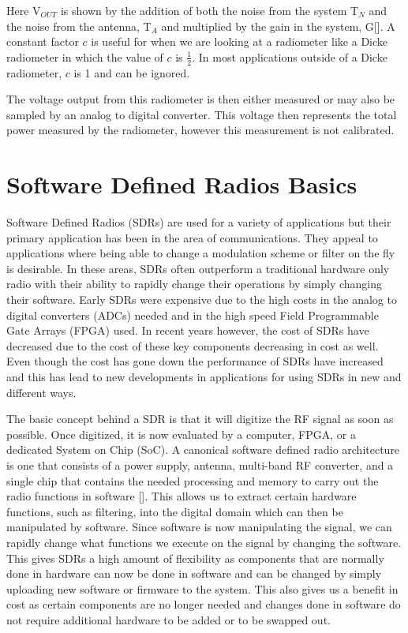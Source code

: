Here V$_{OUT}$ is shown by the addition of both the noise from the system T$_N$ and the noise from the antenna, T$_A$ and multiplied by the gain in the system, G[\cite{skou}].  A constant factor $c$ is useful for when we are looking at a radiometer like a Dicke radiometer in which the value of $c$ is $\frac{1}{2}$.  In most applications outside of a Dicke radiometer, $c$ is 1 and can be ignored.  

The voltage output from this radiometer is then either measured or may also be sampled by an analog to digital converter.  This voltage then represents the total power measured by the radiometer, however this measurement is not calibrated.
 
\section{Software Defined Radios Basics} 
Software Defined Radios (SDRs) are used for a variety of applications but their primary application has been in the area of communications.  They appeal to applications where being able to change a modulation scheme or filter on the fly is desirable.  In these areas, SDRs often outperform a traditional hardware only radio with their ability to rapidly change their operations by simply changing their software.  Early SDRs were expensive due to the high costs in the analog to digital converters (ADCs) needed and in the high speed Field Programmable Gate Arrays (FPGA) used.  In recent years however, the cost of SDRs have decreased due to the cost of these key components decreasing in cost as well.  Even though the cost has gone down the performance of SDRs have increased and this has lead to new developments in applications for using SDRs in new and different ways.

The basic concept behind a SDR is that it will digitize the RF signal as soon as possible.  Once digitized, it is now evaluated by a computer, FPGA, or a dedicated System on Chip (SoC).  A canonical software defined radio architecture is one that consists of a power supply, antenna, multi-band RF converter, and a single chip that contains the needed processing and memory to carry out the radio functions in software [\cite{Mitola1995}]. This allows us to extract certain hardware functions, such as filtering, into the digital domain which can then be manipulated by software.  Since software is now manipulating the signal, we can rapidly change what functions we execute on the signal by changing the software.  This gives SDRs a high amount of flexibility as components that are normally done in hardware can now be done in software and can be changed by simply uploading new software or firmware to the system.  This also gives us a benefit in cost as certain components are no longer needed and changes done in software do not require additional hardware to be added or to be swapped out.

